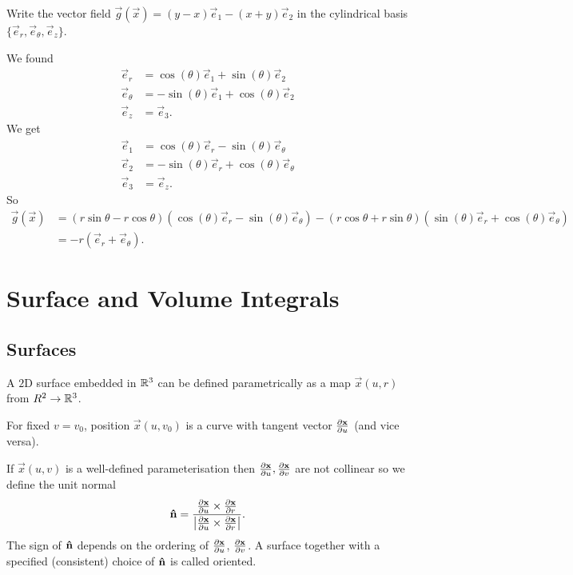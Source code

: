 \documentclass[10pt, a4paper]{article}
\begin{document}
\begin{example}
    Write the vector field $\vec{g}(\vec{x}) = (y - x)\vec{e}_1 - (x + y)\vec{e}_2$ in the cylindrical basis $\{\vec{e}_r, \vec{e}_{\theta}, \vec{e}_z\}$.

    \begin{solution}
        We found
        \begin{align*}
            \vec{e}_r &= \cos(\theta)\vec{e}_1 + \sin(\theta)\vec{e}_2 \\
            \vec{e}_{\theta} &= -\sin(\theta)\vec{e}_1 + \cos(\theta)\vec{e}_2 \\
            \vec{e}_z &= \vec{e}_3.
        \end{align*}
        We get
        \begin{align*}
            \vec{e}_1 &= \cos(\theta)\vec{e}_r - \sin(\theta)\vec{e}_{\theta} \\
            \vec{e}_2 &= -\sin(\theta)\vec{e}_r + \cos(\theta)\vec{e}_{\theta} \\
            \vec{e}_3 &= \vec{e}_z.
        \end{align*}
        So
        \begin{align*}
            \vec{g}(\vec{x}) &= (r\sin{\theta} - r\cos{\theta})(\cos(\theta)\vec{e}_r - \sin(\theta)\vec{e}_{\theta}) - (r\cos{\theta} + r\sin{\theta})(\sin(\theta)\vec{e}_r + \cos(\theta)\vec{e}_{\theta}) \\
            &= -r(\vec{e}_r + \vec{e}_{\theta}).
        \end{align*}
    \end{solution}
\end{example}

\newpage

\section{Surface and Volume Integrals}

\subsection{Surfaces}

A $2$D surface embedded in $\R ^ 3$ can be defined parametrically as a map $\vec{x}(u, r)$ from $R ^ 2 \to \R ^ 3$.

For fixed $v = v_0$,
position $\vec{x}(u, v_0)$ is a curve with tangent vector $\pd[\vec{x}]{u}$
(and vice versa).

If $\vec{x}(u, v)$ is a well-defined parameterisation then $\pd[\vec{x}]{u}, \pd[\vec{x}]{v}$ are not collinear so we define the unit normal
\[
\hvec{n} = \frac{\pd[\vec{x}]{u}\times\pd[\vec{x}]{r}}{\left|\pd[\vec{x}]{u}\times\pd[\vec{x}]{r}\right|}.
\]
The sign of $\hvec{n}$ depends on the ordering of $\pd[\vec{x}]{u}$,
$\pd[\vec{x}]{v}$.
A surface together with a specified
(consistent)
choice of $\hvec{n}$ is called oriented.
\end{document}
